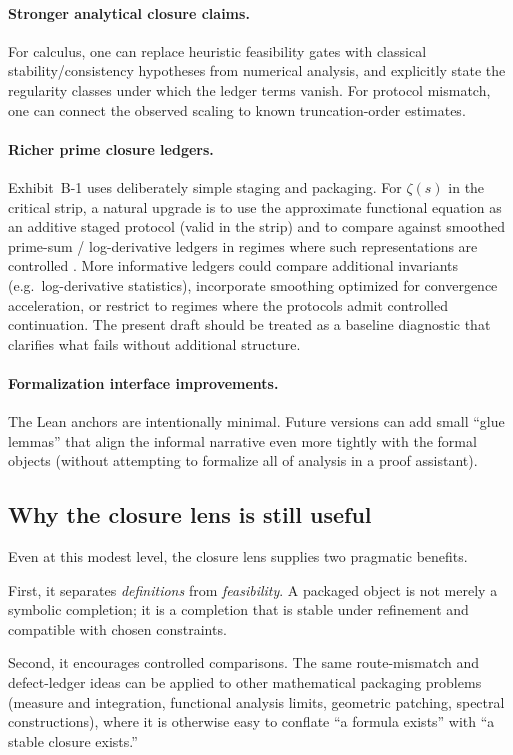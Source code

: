 \documentclass[apajournal,article,submit,moreauthors,pdftex]{Definitions/mdpi}
\begin{document}
\paragraph{Stronger analytical closure claims.}
For calculus, one can replace heuristic feasibility gates with classical stability/consistency hypotheses from numerical analysis, and explicitly state the regularity classes under which the ledger terms vanish.
For protocol mismatch, one can connect the observed scaling to known truncation-order estimates.

\paragraph{Richer prime closure ledgers.}
Exhibit~B-1 uses deliberately simple staging and packaging.
For $\zeta(s)$ in the critical strip, a natural upgrade is to use the approximate functional equation as an additive staged protocol (valid in the strip) and to compare against smoothed prime-sum / log-derivative ledgers in regimes where such representations are controlled \cite{Titchmarsh1986}.
More informative ledgers could compare additional invariants (e.g.\ log-derivative statistics), incorporate smoothing optimized for convergence acceleration, or restrict to regimes where the protocols admit controlled continuation.
The present draft should be treated as a baseline diagnostic that clarifies what fails without additional structure.

\paragraph{Formalization interface improvements.}
The Lean anchors are intentionally minimal.
Future versions can add small ``glue lemmas'' that align the informal narrative even more tightly with the formal objects (without attempting to formalize all of analysis in a proof assistant).

\subsection{Why the closure lens is still useful}
Even at this modest level, the closure lens supplies two pragmatic benefits.

First, it separates \emph{definitions} from \emph{feasibility}.
A packaged object is not merely a symbolic completion; it is a completion that is stable under refinement and compatible with chosen constraints.

Second, it encourages controlled comparisons.
The same route-mismatch and defect-ledger ideas can be applied to other mathematical packaging problems (measure and integration, functional analysis limits, geometric patching, spectral constructions), where it is otherwise easy to conflate ``a formula exists'' with ``a stable closure exists.''
\end{document}
